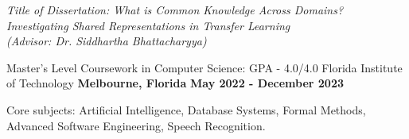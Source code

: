 \begin{cventries}
{\begin{cvitems}
\item \emph{Title of Dissertation: \emph{What is Common Knowledge Across Domains? Investigating Shared Representations in Transfer Learning} \\(Advisor: Dr. Siddhartha Bhattacharyya)}
\end{cvitems}
}
\cventry
{Master's Level Coursework in Computer Science: GPA - 4.0/4.0}
{Florida Institute of Technology}
{\textbf{Melbourne, Florida}}
{\textbf{May 2022 - December 2023}}
{
\begin{cvitems}
    \item Core subjects: Artificial Intelligence, Database Systems, Formal Methods, Advanced Software Engineering, Speech Recognition.
\end{cvitems}
}
\end{cventries}

